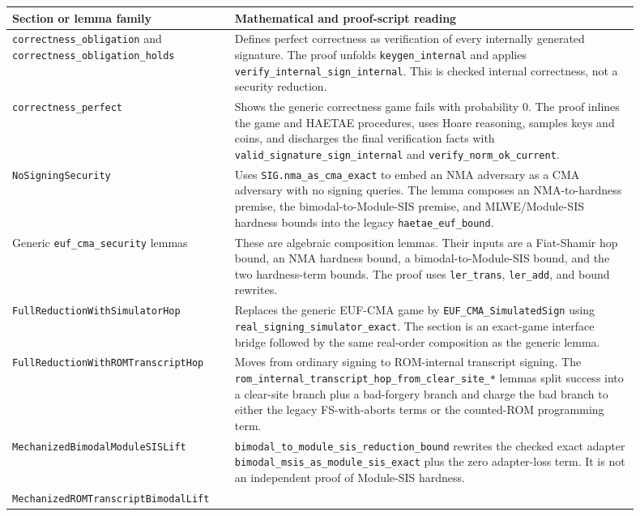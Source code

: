 \documentclass[11pt]{report}
\DeclareRobustCommand{\ec}[1]{\ifmmode\text{\nolinkurl{#1}}\else\nolinkurl{#1}\fi}
\theoremstyle{definition}
\theoremstyle{plain}
\begin{document}
\begin{longtable}{p{0.30\linewidth}p{0.60\linewidth}}
\toprule
\textbf{Section or lemma family} & \textbf{Mathematical and proof-script reading} \\
\midrule
\ec{correctness\_obligation} and
\ec{correctness\_obligation\_holds} &
Defines perfect correctness as verification of every internally generated
signature.  The proof unfolds \ec{keygen\_internal} and applies
\ec{verify\_internal\_sign\_internal}.  This is checked internal correctness,
not a security reduction. \\
\ec{correctness\_perfect} &
Shows the generic correctness game fails with probability \(0\).  The proof
inlines the game and HAETAE procedures, uses Hoare reasoning, samples keys and
coins, and discharges the final verification facts with
\ec{valid\_signature\_sign\_internal} and \ec{verify\_norm\_ok\_current}. \\
\ec{NoSigningSecurity} &
Uses \ec{SIG.nma\_as\_cma\_exact} to embed an NMA adversary as a CMA adversary
with no signing queries.  The lemma composes an NMA-to-hardness premise, the
bimodal-to-Module-SIS premise, and MLWE/Module-SIS hardness bounds into the
legacy \ec{haetae\_euf\_bound}. \\
Generic \ec{euf\_cma\_security} lemmas &
These are algebraic composition lemmas.  Their inputs are a Fiat-Shamir
hop bound, an NMA hardness bound, a bimodal-to-Module-SIS bound, and the two
hardness-term bounds.  The proof uses \ec{ler\_trans}, \ec{ler\_add}, and
bound rewrites. \\
\ec{FullReductionWithSimulatorHop} &
Replaces the generic EUF-CMA game by \ec{EUF\_CMA\_SimulatedSign} using
\ec{real\_signing\_simulator\_exact}.  The section is an exact-game
interface bridge followed by the same real-order composition as the generic
lemma. \\
\ec{FullReductionWithROMTranscriptHop} &
Moves from ordinary signing to ROM-internal transcript signing.  The
\ec{rom\_internal\_transcript\_hop\_from\_clear\_site\_*} lemmas split success
into a clear-site branch plus a bad-forgery branch and charge the bad branch to
either the legacy FS-with-aborts terms or the counted-ROM programming term. \\
\ec{MechanizedBimodalModuleSISLift} &
\ec{bimodal\_to\_module\_sis\_reduction\_bound} rewrites the checked exact
adapter \ec{bimodal\_msis\_as\_module\_sis\_exact} plus the zero adapter-loss
term.  It is not an independent proof of Module-SIS hardness. \\
\ec{MechanizedROMTranscriptBimodalLift} &

\end{longtable}
\end{document}
